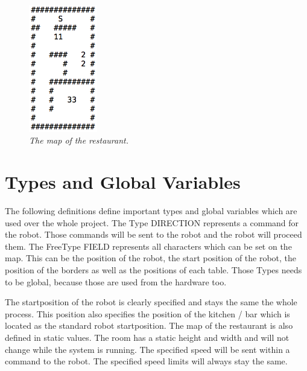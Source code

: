 \documentclass[11pt,a4paper]{article}
\begin{document}
\begin{figure}[!ht]
\centering
\includegraphics[width=30mm,scale=0.5]{images/map}
\caption{\em The map of the restaurant.}
\label{fig:map}
\end{figure}

\newpage
{}
\section{Types and Global Variables}
The following definitions define important types and global variables which are used over the whole project. The Type DIRECTION represents a command for the robot. Those commands will be sent to the robot and the robot will proceed them. The FreeType FIELD represents all characters which can be set on the map. This can be the position of the robot, the start position of the robot, the position of the borders as well as the positions of each table. Those Types needs to be global, because those are used from the hardware too.

The startposition of the robot is clearly specified and stays the same the whole process. This position also specifies the position of the kitchen / bar which is located as the standard robot startposition. The map of the restaurant is also defined in static values. The room has a static height and width and will not change while the system is running. The specified speed will be sent within a command to the robot. The specified speed limits will always stay the same.
\end{document}

